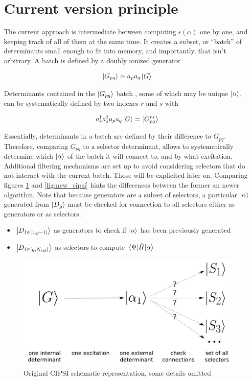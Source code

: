 \documentclass[./thesis.tex]{subfiles}
\newcommand{\Gpqrs}{\ket{G^{rs}_{pq}}}
\begin{document}
\section{Current version principle}

The current approach is intermediate between computing $\epsilon(\alpha)$ one by one, and keeping track of all of them at the same time.
It creates a subset, or ``batch'' of determinants small enough to fit into memory, and importantly, that isn't arbitrary.
A batch is defined by a doubly ionized generator


\begin{equation}
\ket {G_{pq}} = a_p a_q \ket G
\end{equation}



Determinants contained in the $\ket {G_{pq}}$ batch , some of which may be unique ${\ket{\alpha}}$, can be systematically defined by two indexes $r$ and $s$ with

\begin{equation}
a^\dagger_r a^\dagger_s a_p a_q  \ket G = \Gpqrs
\end{equation}

Essentially, determinants in a batch are defined by their difference to $G_{pq}$. Therefore, comparing $G_{pq}$ to a selector determinant, allows to systematically determine which ${\ket{\alpha}}$ of the batch it will connect to, and by what excitation. Additional filtering mechanisms are set up to avoid considering selectors that do not interact with the current batch. Those will be explicited later on. Comparing figures \ref{fig:old_cipsi} and \ref{fig:new_cipsi} hints the differences between the former an newer algorithm. Note that because generators are a subset of selectors, a particular ${\ket{\alpha}}$ generated from $\ket {D_g}$ must be checked for connection to all selectors either as generators or as selectors.

\begin{itemize}
\item
$\ket {D_{I \in [1,g-1]}}$ as generators to check if ${\ket{\alpha}}$ has been previously generated
\item
$\ket {D_{I \in [g,N_{sel}]}}$ as selectors to compute $\mel{\Psi}{\hat{H}}{\alpha}$
\end{itemize}


\begin{figure}[h!]
	\begin{center}
		\includegraphics[width=0.7\columnwidth]{figures/cipsi/old_cipsi}
		\caption{Original CIPSI schematic representation, some details omitted}
		\label{fig:old_cipsi}
	\end{center}
\end{figure}
\end{document}
